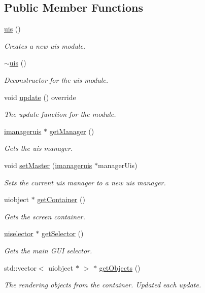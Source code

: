\subsection*{Public Member Functions}
\begin{DoxyCompactItemize}
\item 
\hyperlink{classflounder_1_1uis_a8deaea4a00735b3d102d0fb3fdad3098}{uis} ()
\begin{DoxyCompactList}\small\item\em Creates a new uis module. \end{DoxyCompactList}\item 
\hyperlink{classflounder_1_1uis_ab258b390cfadde407fc72d1adbb14f17}{$\sim$uis} ()
\begin{DoxyCompactList}\small\item\em Deconstructor for the uis module. \end{DoxyCompactList}\item 
void \hyperlink{classflounder_1_1uis_a234b52f70d1819932752a03168f21e10}{update} () override
\begin{DoxyCompactList}\small\item\em The update function for the module. \end{DoxyCompactList}\item 
\hyperlink{classflounder_1_1imanageruis}{imanageruis} $\ast$ \hyperlink{classflounder_1_1uis_a0f6b2bd57647e10aaf348465c9b0cf6e}{get\+Manager} ()
\begin{DoxyCompactList}\small\item\em Gets the uis manager. \end{DoxyCompactList}\item 
void \hyperlink{classflounder_1_1uis_a7c9d9da159b38dd8e4476b75af71b33b}{set\+Master} (\hyperlink{classflounder_1_1imanageruis}{imanageruis} $\ast$manager\+Uis)
\begin{DoxyCompactList}\small\item\em Sets the current uis manager to a new uis manager. \end{DoxyCompactList}\item 
uiobject $\ast$ \hyperlink{classflounder_1_1uis_aa33276aec565ade80ad7770b0e3b9e67}{get\+Container} ()
\begin{DoxyCompactList}\small\item\em Gets the screen container. \end{DoxyCompactList}\item 
\hyperlink{classflounder_1_1uiselector}{uiselector} $\ast$ \hyperlink{classflounder_1_1uis_ae6d263255b82ee6358afe91cc55ca889}{get\+Selector} ()
\begin{DoxyCompactList}\small\item\em Gets the main G\+UI selector. \end{DoxyCompactList}\item 
std\+::vector$<$ uiobject $\ast$ $>$ $\ast$ \hyperlink{classflounder_1_1uis_af2c2a4e585933105ed3ce193212974ae}{get\+Objects} ()
\begin{DoxyCompactList}\small\item\em The rendering objects from the container. Updated each update. \end{DoxyCompactList}\end{DoxyCompactItemize}
